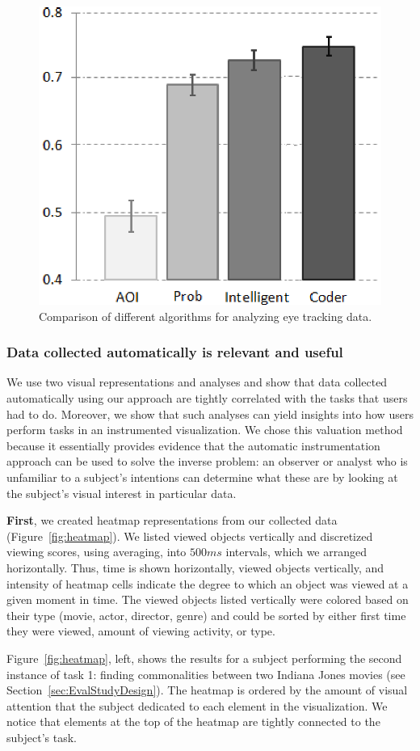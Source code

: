 \begin{figure}[htb]
  \centering
  \includegraphics[width=0.6\linewidth]{images/algosComparison.eps}
  \caption{Comparison of different algorithms for analyzing eye tracking data.}
	\label{fig:quantitative}
\end{figure}


\subsubsection{Data collected automatically is relevant and useful}
\label{sec:EvalDataCollected}
We use two visual representations and analyses and show that data collected automatically using our approach are tightly correlated with the tasks that users had to do. Moreover, we show that such analyses can yield insights into how users perform tasks in an instrumented visualization. We chose this valuation method because it essentially provides evidence that the automatic instrumentation approach can be used to solve the inverse problem: an observer or analyst who is unfamiliar to a subject's intentions can determine what these are by looking at the subject's visual interest in particular data. 

\textbf{First}, we created heatmap representations from our collected data (Figure~\ref{fig:heatmap}). We listed viewed objects vertically and discretized viewing scores, using averaging, into $500ms$ intervals, which we arranged horizontally. Thus, time is shown horizontally, viewed objects vertically, and intensity of heatmap cells indicate the degree to which an object was viewed at a given moment in time. The viewed objects listed vertically were colored based on their type (movie, actor, director, genre) and could be sorted by either first time they were viewed, amount of viewing activity, or type. 

Figure~\ref{fig:heatmap}, left, shows the results for a subject performing the second instance of task 1: finding commonalities between two Indiana Jones movies (see Section~\ref{sec:EvalStudyDesign}). The heatmap is ordered by the amount of visual attention that the subject dedicated to each element in the visualization. We notice that elements at the top of the heatmap are tightly connected to the subject's  task.   

